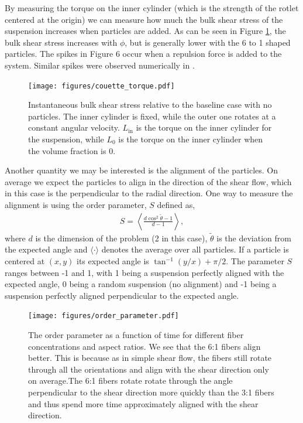 \documentclass[preprint, 10pt]{elsarticle}
\begin{document}
By measuring the torque on the inner cylinder (which is the strength of the
rotlet centered at the origin) we can measure how much the bulk shear stress of the suspension
increases when particles are added. As can be seen in Figure
\ref{fig:torque}, the bulk shear stress increases with $\phi$, but is
generally lower with the 6 to 1 shaped particles. The spikes in Figure 6 occur
when a repulsion force is added to the system. Similar spikes were observed numerically in
\cite{Lu2017}.
\begin{figure}[!h]
\begin{center}
\texttt{[image: figures/couette\_torque.pdf]}\\
\end{center}
\caption{Instantaneous bulk shear stress relative to the baseline case with no particles. The inner
cylinder is fixed, while the outer one rotates at a constant angular velocity. $L_{\text{in}}$ is
the torque on the inner cylinder for the suspension, while $L_0$ is the torque on the inner cylinder
when the volume fraction is 0.}\label{fig:torque}
\end{figure} 

Another quantity we may be interested is the alignment of the particles. On
average we expect the particles to align in the direction of the shear flow,
which in this case is the perpendicular to the radial direction. One way
to measure the alignment is using the order parameter, $S$ defined as,
\begin{align*}
  S = \left\langle \frac{d \cos^2\tilde{\theta} - 1}{d - 1} \right\rangle,
\end{align*}
where $d$ is the dimension of the problem (2 in this case),
$\tilde{\theta}$ is the deviation from the expected angle and $\langle
\cdot\rangle$ denotes the average over all particles. If a particle is
centered at $(x,y)$ its expected angle is $\tan^{-1}(y/x) + \pi/2$. The
parameter $S$ ranges between -1 and 1, with 1 being a suspension
perfectly aligned with the expected angle, 0 being a random suspension
(no alignment) and -1 being a suspension perfectly aligned perpendicular
to the expected angle.

\begin{figure}[!h]
\begin{center}
\texttt{[image: figures/order\_parameter.pdf]}\\
\end{center}
\caption{The order parameter as a function of time for different fiber concentrations and aspect
ratios. We see that the 6:1 fibers align better. This is because as in simple shear flow, the fibers
still rotate through all the orientations and align with the shear direction only on average.The 6:1
fibers rotate rotate through the angle perpendicular to the shear direction more quickly than the
3:1 fibers and thus spend more time approximately aligned with the shear direction.
}\label{fig:angles}
\end{figure} 
\end{document}
